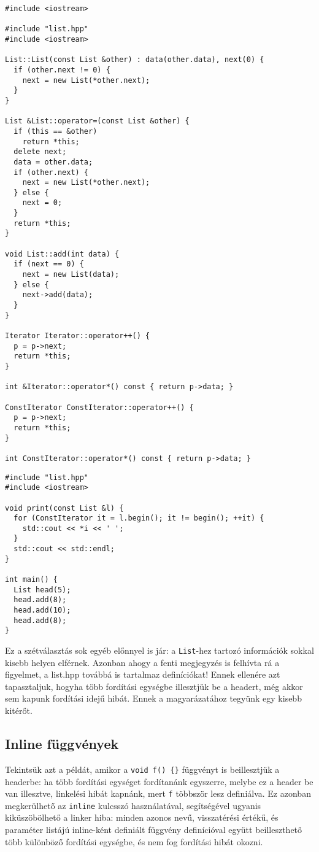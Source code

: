 \documentclass[../cpp_book/cpp_book.tex]{subfiles}
\begin{document}
\begin{lstlisting}
#include <iostream>

#include "list.hpp"
#include <iostream>

List::List(const List &other) : data(other.data), next(0) {
  if (other.next != 0) {
    next = new List(*other.next);
  }
}

List &List::operator=(const List &other) {
  if (this == &other)
    return *this;
  delete next;
  data = other.data;
  if (other.next) {
    next = new List(*other.next);
  } else {
    next = 0;
  }
  return *this;
}

void List::add(int data) {
  if (next == 0) {
    next = new List(data);
  } else {
    next->add(data);
  }
}

Iterator Iterator::operator++() {
  p = p->next;
  return *this;
}

int &Iterator::operator*() const { return p->data; }

ConstIterator ConstIterator::operator++() {
  p = p->next;
  return *this;
}

int ConstIterator::operator*() const { return p->data; }
\end{lstlisting}
\begin{lstlisting}
#include "list.hpp"
#include <iostream>

void print(const List &l) {
  for (ConstIterator it = l.begin(); it != begin(); ++it) {
    std::cout << *i << ' ';
  }
  std::cout << std::endl;
}

int main() {
  List head(5);
  head.add(8);
  head.add(10);
  head.add(8);
}
\end{lstlisting}
	
	Ez a szétválasztás sok egyéb előnnyel is jár: a \texttt{List}-hez tartozó információk sokkal kisebb helyen elférnek. Azonban ahogy a fenti megjegyzés is felhívta rá a figyelmet, a list.hpp továbbá is tartalmaz definíciókat! Ennek ellenére azt tapasztaljuk, hogyha több fordítási egységbe illesztjük be a headert, még akkor sem kapunk fordítási idejű hibát. Ennek a magyarázatához tegyünk egy kisebb kitérőt.
	\subsection{Inline függvények}
	
	Tekintsük azt a példát, amikor a \texttt{void f() \{\}} függvényt is beillesztjük a headerbe: ha több fordítási egységet fordítanánk egyszerre, melybe ez a header be van illesztve, linkelési hibát kapnánk, mert \texttt{f} többször lesz definiálva. Ez azonban megkerülhető az \texttt{inline} kulcsszó használatával, segítségével ugyanis kiküszöbölhető a linker hiba: minden azonos nevű, visszatérési értékű, és paraméter listájú inline-ként definiált függvény definícióval együtt beilleszthető több különböző fordítási egységbe, és nem fog fordítási hibát okozni.
	
\end{document}
